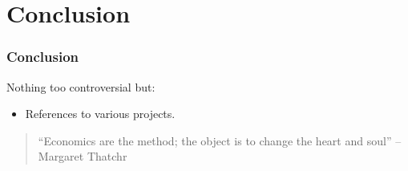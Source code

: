 \documentclass{beamer}
\begin{document}
\section{Conclusion}
\begin{frame}\frametitle{Conclusion}
Nothing too controversial but:
\begin{itemize}
\item References to various projects.
\end{itemize}
\pause
\begin{quote}
``Economics are the method; \pause
the object is to change the heart and soul'' -- Margaret Thatchr
\end{quote}
\end{frame}
\end{document}
